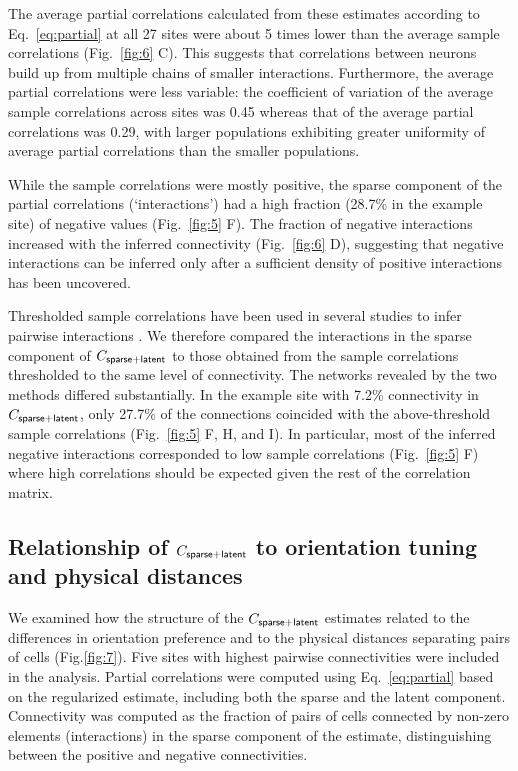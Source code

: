 The average partial correlations calculated from these estimates according to Eq.~\ref{eq:partial} at all 27 sites were about 5 times lower than the average sample correlations (Fig.~\ref{fig:6} C). This suggests that correlations between neurons build up from multiple chains of smaller interactions. Furthermore, the average partial correlations were less variable: the coefficient of variation of the average sample correlations across sites was 0.45 whereas that of the average partial correlations was 0.29, with larger populations exhibiting greater uniformity of average partial correlations than the smaller populations.

While the sample correlations were mostly positive, the sparse component of the partial correlations (`interactions') had a high fraction (28.7\% in the example site) of negative values (Fig.~\ref{fig:5} F). The fraction of negative interactions increased with the inferred connectivity (Fig.~\ref{fig:6} D), suggesting that negative interactions can be inferred only after a sufficient density of positive interactions has been uncovered.

Thresholded sample correlations have been used in several studies to infer pairwise interactions \cite{Golshani:2009, Feldt:2011, Malmersjo:2013, Sadovsky:2014}.  We therefore compared the interactions in the sparse component of $C_{\sf sparse+latent}$ to those obtained from the sample correlations thresholded to the same level of connectivity. The networks revealed by the two methods differed substantially. In the example site with 7.2\% connectivity in $C_{\sf sparse+latent}$, only 27.7\% of the connections coincided with the above-threshold sample correlations (Fig.~\ref{fig:5} F, H, and I). In particular, most of the inferred negative interactions corresponded to low sample correlations (Fig.~\ref{fig:5} F) where high correlations should be expected given the rest of the correlation matrix.

\subsection*{Relationship of $C_{\sf sparse+latent}$ to orientation tuning and physical distances}


We examined how the structure of the $C_{\sf sparse+latent}$ estimates related to the differences in orientation preference and to the physical distances separating pairs of cells (Fig.\;\ref{fig:7}).  Five sites with highest pairwise connectivities were included in the analysis. Partial correlations were computed using Eq.~\ref{eq:partial} based on the regularized estimate, including both the sparse and the latent component. Connectivity was computed as the fraction of pairs of cells connected by non-zero elements (interactions) in the sparse component of the estimate, distinguishing between the positive and negative connectivities.

